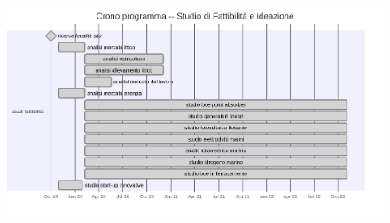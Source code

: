 \documentclass[
  onecolumn]{report}
\begin{document}
\begin{figure}[H]

{\centering \includegraphics[width=8.17in,height=4.54in]{lettera_files/figure-latex/mermaid-figure-1.png}

}

\end{figure}
\end{document}
